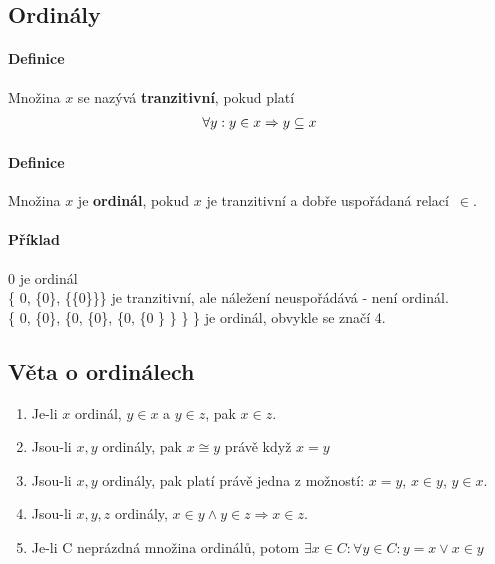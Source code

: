\documentclass[a4paper,12pt,titlepage]{article}
\begin{document}
\subsection{Ordinály}
\setcounter{equation}{0}
\paragraph{Definice}
Množina $x$ se nazývá \textbf{tranzitivní}, pokud platí 
\begin{align}
	\forall y: y \in x \Rightarrow y \subseteq x
\end{align}
\paragraph{Definice}
Množina $x$ je \textbf{ordinál}, pokud $x$ je tranzitivní a dobře uspořádaná
relací~$\in$.
\paragraph{Příklad}
0  je ordinál \\
\{ 0, \{0\}, \{\{0\}\}\} je tranzitivní, ale náležení neuspořádává - není
ordinál. \\
\{ 0, \{0\}, \{0, \{0\}, \{0, \{0 \} \} \} \} je ordinál, obvykle se značí 4.

\subsection{Věta o ordinálech}
\setcounter{equation}{0}
\begin{enumerate}
	\item Je-li $x$ ordinál, $y \in x$ a $y \in z$, pak $x \in z$.
	\item Jsou-li $x, y$ ordinály, pak $x \cong y$ právě když $x = y$
	\item Jsou-li $x, y$ ordinály, pak platí právě jedna z možností: $x = y$, $x
	\in y$, $y \in x$.
	\item Jsou-li $x,y, z$ ordinály, $x \in y \land y \in z \Rightarrow x \in z$.
	\item Je-li C neprázdná množina ordinálů, potom $\exists x \in C: \forall y
	\in C: y = x \lor x \in y$
\end{enumerate}
\end{document}
